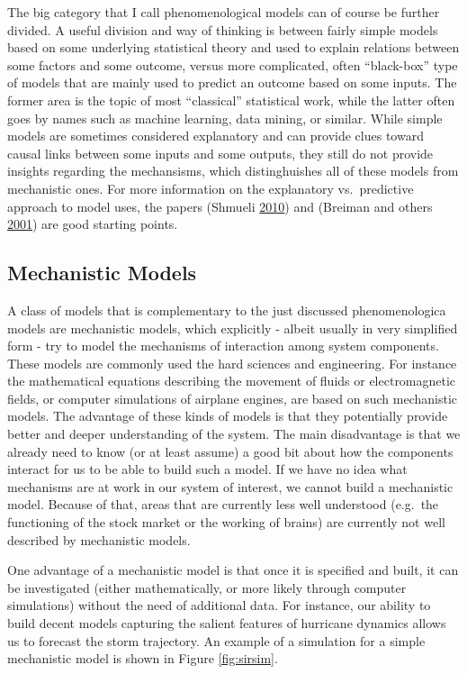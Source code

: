 \documentclass[
]{book}
\begin{document}
The big category that I call phenomenological models can of course be further divided. A useful division and way of thinking is between fairly simple models based on some underlying statistical theory and used to explain relations between some factors and some outcome, versus more complicated, often ``black-box'' type of models that are mainly used to predict an outcome based on some inputs. The former area is the topic of most ``classical'' statistical work, while the latter often goes by names such as machine learning, data mining, or similar. While simple models are sometimes considered explanatory and can provide clues toward causal links between some inputs and some outputs, they still do not provide insights regarding the mechansisms, which distinghuishes all of these models from mechanistic ones. For more information on the explanatory vs.~predictive approach to model uses, the papers (Shmueli \protect\hyperlink{ref-shmueli10}{2010}) and (Breiman and others \protect\hyperlink{ref-breiman01}{2001}) are good starting points.

\hypertarget{mechanistic-models}{%
\subsection{Mechanistic Models}\label{mechanistic-models}}

A class of models that is complementary to the just discussed phenomenologica models are mechanistic models, which explicitly - albeit usually in very simplified form - try to model the mechanisms of interaction among system components. These models are commonly used the hard sciences and engineering. For instance the mathematical equations describing the movement of fluids or electromagnetic fields, or computer simulations of airplane engines, are based on such mechanistic models. The advantage of these kinds of models is that they potentially provide better and deeper understanding of the system. The main disadvantage is that we already need to know (or at least assume) a good bit about how the components interact for us to be able to build such a model. If we have no idea what mechanisms are at work in our system of interest, we cannot build a mechanistic model. Because of that, areas that are currently less well understood (e.g.~the functioning of the stock market or the working of brains) are currently not well described by mechanistic models.

One advantage of a mechanistic model is that once it is specified and built, it can be investigated (either mathematically, or more likely through computer simulations) without the need of additional data. For instance, our ability to build decent models capturing the salient features of hurricane dynamics allows us to forecast the storm trajectory. An example of a simulation for a simple mechanistic model is shown in Figure \ref{fig:sirsim}.
\end{document}
